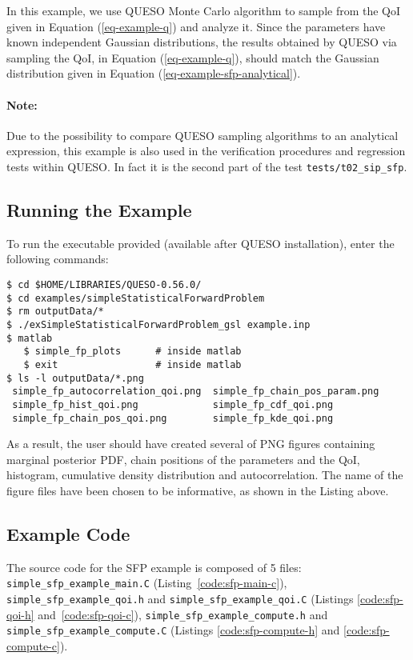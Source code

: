 In this example, we use QUESO Monte Carlo algorithm to sample from the QoI given in Equation (\ref{eq-example-q}) and analyze it. 
Since the parameters have known independent Gaussian distributions, the results obtained by QUESO via sampling the QoI, in Equation (\ref{eq-example-q}), should match the Gaussian distribution given in Equation (\ref{eq-example-sfp-analytical}).


\paragraph*{Note:} Due to the possibility to compare QUESO sampling algorithms to an analytical expression, this example is also used in the verification procedures and regression tests within QUESO. In fact it is the second part of the test \verb+tests/t02_sip_sfp+.


\subsection{Running the Example}\label{sec:sfp-run}
 
To run the executable provided (available after QUESO installation), enter the following commands:
\begin{lstlisting}[label={},caption={}]
$ cd $HOME/LIBRARIES/QUESO-0.56.0/
$ cd examples/simpleStatisticalForwardProblem
$ rm outputData/*
$ ./exSimpleStatisticalForwardProblem_gsl example.inp    
$ matlab
   $ simple_fp_plots      # inside matlab
   $ exit                 # inside matlab
$ ls -l outputData/*.png
 simple_fp_autocorrelation_qoi.png  simple_fp_chain_pos_param.png  
 simple_fp_hist_qoi.png             simple_fp_cdf_qoi.png
 simple_fp_chain_pos_qoi.png        simple_fp_kde_qoi.png
\end{lstlisting}

As a result, the user should have created several of PNG figures containing marginal posterior PDF, chain positions of the parameters and the QoI, histogram, cumulative density distribution and autocorrelation. The name of the figure files have been chosen to be informative, as shown in the Listing above.



\subsection{Example Code}\label{sec:code-sfp}

The source code for the SFP example is composed of 5 files:
\texttt{simple\_sfp\_example\_main.C} (Listing~\ref{code:sfp-main-c}),
\texttt{simple\_sfp\_example\_qoi.h} and \texttt{simple\_sfp\_example\_qoi.C} (Listings \ref{code:sfp-qoi-h} and~\ref{code:sfp-qoi-c}),
\texttt{simple\_sfp\_example\_compute.h}  and \texttt{simple\_sfp\_example\_compute.C} (Listings \ref{code:sfp-compute-h} and \ref{code:sfp-compute-c}).


